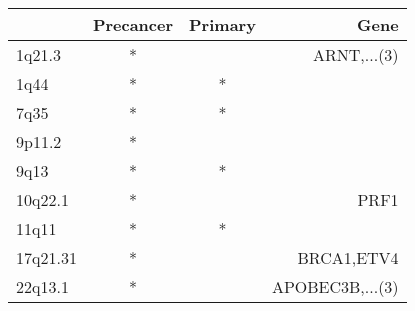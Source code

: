 \begin{tabular}{lccr}
\toprule
{} & Precancer & Primary &             Gene \\
\midrule
1q21.3   &         * &         &      ARNT,...(3) \\
1q44     &         * &       * &                  \\
7q35     &         * &       * &                  \\
9p11.2   &         * &         &                  \\
9q13     &         * &       * &                  \\
10q22.1  &         * &         &             PRF1 \\
11q11    &         * &       * &                  \\
17q21.31 &         * &         &       BRCA1,ETV4 \\
22q13.1  &         * &         &  APOBEC3B,...(3) \\
\bottomrule
\end{tabular}
